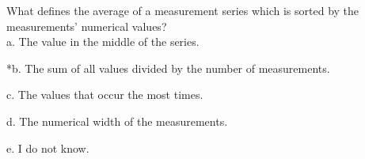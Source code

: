 
What defines the average of a measurement series which is sorted by
the measurements' numerical values?\\

a. The value in the middle of the series.

*b. The sum of all values divided by the number of measurements.

c. The values that occur the most times.

d. The numerical width of the measurements.

e. I do not know.\\
